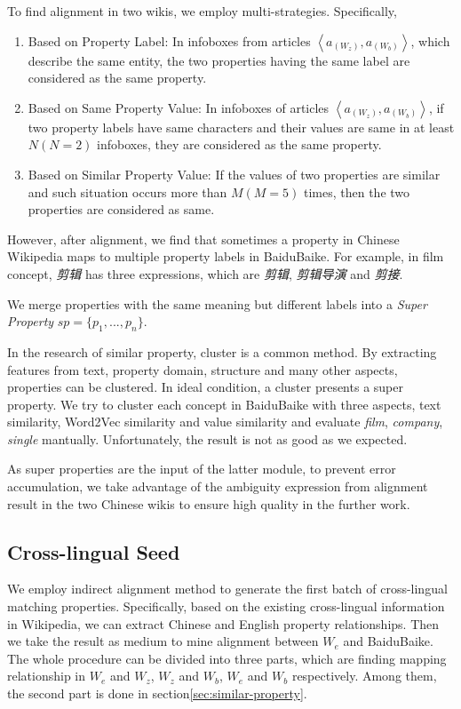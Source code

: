 \documentclass[runningheads,a4paper]{llncs}
\begin{document}
To find alignment in two wikis, we employ multi-strategies. Specifically,
\begin{enumerate}[1]
\item Based on Property Label: In infoboxes from articles $\left<a_(W_z), a_(W_b)\right>$, which describe the same entity, the two properties having the same label are considered as the same property. 
\item Based on Same Property Value: In infoboxes of articles $\left<a_(W_z), a_(W_b)\right>$, if two property labels have same characters and their values are same in at least $N(N=2)$ infoboxes, they are considered as the same property. 
\item Based on Similar Property Value: If the values of two properties are similar and such situation occurs more than $M(M=5)$ times, then the two properties are considered as same.
\end{enumerate}

However, after alignment, we find that sometimes a property in Chinese Wikipedia maps to multiple property labels in BaiduBaike. For example, in film concept, \textit{剪辑} has three expressions, which are \textit{剪辑}, \textit{剪辑导演} and \textit{剪接}.

We merge properties with the same meaning but different labels into a \textit{Super Property} $sp=\{p_1,...,p_n\}$.

In the research of similar property, cluster is a common method. By extracting features from text, property domain, structure and many other aspects, properties can be clustered. In ideal condition, a cluster presents a super property. We try to cluster each concept in BaiduBaike with three aspects, text similarity, Word2Vec similarity and value similarity and evaluate \textit{film}, \textit{company}, \textit{single} mantually. Unfortunately, the result is not as good as we expected.

As super properties are the input of the latter module, to prevent error accumulation, we take advantage of the ambiguity expression from alignment result in the two Chinese wikis to ensure high quality in the further work.

\subsection{Cross-lingual Seed}
We employ indirect alignment method to generate the first batch of cross-lingual matching properties. Specifically, based on the existing cross-lingual information in Wikipedia, we can extract Chinese and English property relationships. Then we take the result as medium to mine alignment between $W_e$ and BaiduBaike. The whole procedure can be divided into three parts, which are finding mapping relationship in $W_e$ and $W_z$, $W_z$ and $W_b$, $W_e$ and $W_b$ respectively. Among them, the second part is done in section\ref{sec:similar-property}.
\end{document}
